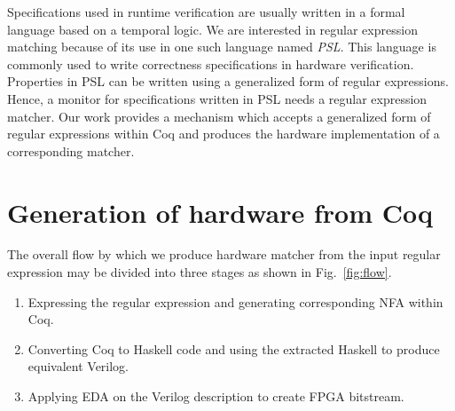 \documentclass{article}
\begin{document}
Specifications used in runtime verification are usually written in a
formal language based on a temporal logic.
We are interested in regular expression matching because of its use in
one such language named \emph{\gls{PSL}}.
This language is commonly used to write correctness specifications in
hardware verification.
%
%
Properties in \gls{PSL} can be written using a generalized form of
regular expressions.
%
Hence, a monitor for specifications written in \gls{PSL} needs a
regular expression matcher.
%
%
Our work provides a mechanism which accepts a generalized form of
regular expressions within Coq and produces the hardware
implementation of a corresponding matcher.

\section{Generation of hardware from Coq}
The overall flow by which we produce hardware matcher from the input
regular expression may be divided into three stages as shown in
Fig.~\ref{fig:flow}.

\begin{enumerate}
\item
  Expressing the regular expression and generating corresponding NFA
  within Coq.
\item
  Converting Coq to Haskell code and using the extracted Haskell
  to produce equivalent Verilog.
\item 
  Applying EDA on the Verilog description to create FPGA bitstream.
\end{enumerate}
\end{document}
